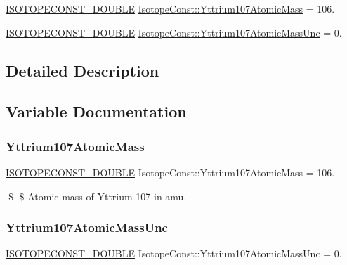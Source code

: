 \begin{DoxyCompactItemize}
\item 
\mbox{\hyperlink{group___isotope_const-_macros_ga8f45a7272ce02c0b4c65c44636ed719a}{I\+S\+O\+T\+O\+P\+E\+C\+O\+N\+S\+T\+\_\+\+D\+O\+U\+B\+LE}} \mbox{\hyperlink{group___isotope_const-_yttrium-_y107_gacd35a2a13bf51733a21bf065eb099c55}{Isotope\+Const\+::\+Yttrium107\+Atomic\+Mass}} = 106.
\item 
\mbox{\hyperlink{group___isotope_const-_macros_ga8f45a7272ce02c0b4c65c44636ed719a}{I\+S\+O\+T\+O\+P\+E\+C\+O\+N\+S\+T\+\_\+\+D\+O\+U\+B\+LE}} \mbox{\hyperlink{group___isotope_const-_yttrium-_y107_ga84c86802d9893d3074ce9b4256e8f2a9}{Isotope\+Const\+::\+Yttrium107\+Atomic\+Mass\+Unc}} = 0.
\end{DoxyCompactItemize}


\subsection{Detailed Description}


\subsection{Variable Documentation}
\mbox{\label{group___isotope_const-_yttrium-_y107_gacd35a2a13bf51733a21bf065eb099c55}} 
\subsubsection{\texorpdfstring{Yttrium107\+Atomic\+Mass}{Yttrium107AtomicMass}}
{\footnotesize\ttfamily \mbox{\hyperlink{group___isotope_const-_macros_ga8f45a7272ce02c0b4c65c44636ed719a}{I\+S\+O\+T\+O\+P\+E\+C\+O\+N\+S\+T\+\_\+\+D\+O\+U\+B\+LE}} Isotope\+Const\+::\+Yttrium107\+Atomic\+Mass = 106.}

\$ \$ Atomic mass of Yttrium-\/107 in amu. \mbox{\label{group___isotope_const-_yttrium-_y107_ga84c86802d9893d3074ce9b4256e8f2a9}} 
\subsubsection{\texorpdfstring{Yttrium107\+Atomic\+Mass\+Unc}{Yttrium107AtomicMassUnc}}
{\footnotesize\ttfamily \mbox{\hyperlink{group___isotope_const-_macros_ga8f45a7272ce02c0b4c65c44636ed719a}{I\+S\+O\+T\+O\+P\+E\+C\+O\+N\+S\+T\+\_\+\+D\+O\+U\+B\+LE}} Isotope\+Const\+::\+Yttrium107\+Atomic\+Mass\+Unc = 0.}


